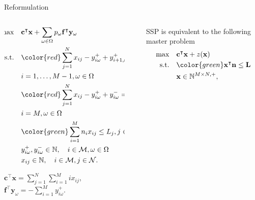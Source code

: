 \begin{frame}{Reformulation}
  \begin{columns}
    \begin{column}{0.49\textwidth}
      \begin{scriptsize}
        \begin{equation*}
          \begin{aligned}
          \hspace{-10mm}
          \max \quad & \mathbf{c}^{\intercal} \mathbf{x} + \sum_{\omega \in \Omega} p_{\omega} \mathbf{f}^{\intercal} \mathbf{y}_{\omega} \\
          \text {s.t.} \quad & {\color{red}\sum_{j= 1}^{N} x_{ij}-y_{i \omega}^{+}+
          y_{i+1, \omega}^{+} + y_{i \omega}^{-}=d_{i \omega}}, \\ & i = 1,\ldots,M-1, \omega \in \Omega \\
          & {\color{red}\sum_{j= 1}^{N} x_{ij} -y_{i \omega}^{+}+y_{i \omega}^{-}=d_{i \omega}}, \\ & i = M, \omega \in \Omega \\
          & {\color{green}\sum_{i=1}^{M} n_{i} x_{ij} \leq L_j}, j \in \mathcal{N}\\
          & y_{i \omega}^{+}, y_{i \omega}^{-} \in \mathbb{N}, \quad i \in \mathcal{M}, \omega \in \Omega \\
          & x_{ij} \in \mathbb{N}, \quad i \in \mathcal{M}, j \in \mathcal{N}.
          \end{aligned}
        \end{equation*}
        \end{scriptsize}
        \begin{tiny}
              $\mathbf{c}^{\intercal} \mathbf{x} =\sum_{j=1}^{N} \sum_{i=1}^{M} i x_{ij}$, $\mathbf{f}^{\intercal} \mathbf{y}_{\omega} = - \sum_{i=1}^{M} y_{i \omega}^{+}$.
        \end{tiny}
    \end{column}
    \begin{column}{.02\textwidth}
      \rule{.1mm}{0.7\textheight}
  \end{column}
    \begin{column}{0.49\textwidth}
      \scriptsize
      SSP is equivalent to the following master problem
      \begin{equation}\label{BD_master}
        \begin{aligned}
      \max \quad & \mathbf{c}^{\intercal} \mathbf{x}+ z(\mathbf{x}) \\
      \text {s.t.} \quad & {\color{green}\mathbf{x}^{\intercal} \mathbf{n} \leq \mathbf{L}} \\
      & \mathbf{x} \in \mathbb{N}^{M \times N, +},
      \end{aligned}
      \end{equation}


\end{column}
\end{columns}
\end{frame}
